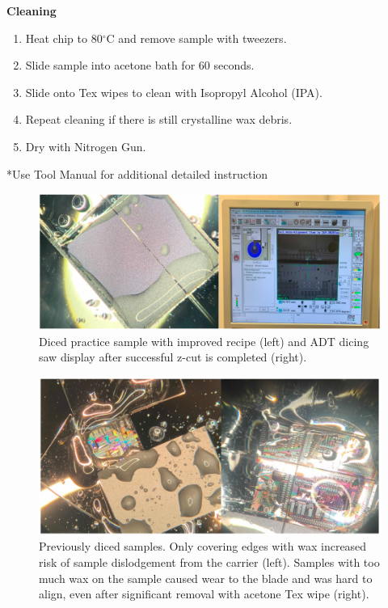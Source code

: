 \textbf{Cleaning}
\begin{enumerate}
    \item Heat chip to 80$^{\circ}$C and remove sample with tweezers.
    \item Slide sample into acetone bath for 60 seconds.
    \item Slide onto Tex wipes to clean with Isopropyl Alcohol (IPA).
    \item Repeat cleaning if there is still crystalline wax debris. 
    \item Dry with Nitrogen Gun.
\end{enumerate}
*Use Tool Manual for additional detailed instruction

\begin{figure}[!ht]
\centering
\includegraphics[width=5in]{./Figures/AppendixA/FigAppA08}
\caption[Diced practice sample with improved recipe and ADT dicing saw display after successful z-cut is completed.]{Diced practice sample with improved recipe  (left) and ADT dicing saw display after successful z-cut is completed (right).}
\label{FigAppA8}
\end{figure}

\begin{figure}[!ht]
\centering
\includegraphics[width=5in]{./Figures/AppendixA/FigAppA09}
\caption[Previously diced samples.]{Previously diced samples. Only covering edges with wax increased risk of sample dislodgement from the carrier (left). Samples with too much wax on the sample caused wear to the blade and was hard to align, even after significant removal with acetone Tex wipe (right). }
\label{FigAppA9}
\end{figure}

